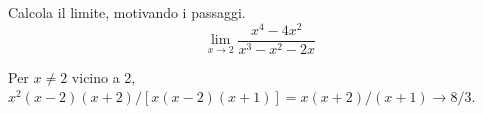 
\begin{esercizio}
Calcola il limite, motivando i passaggi.
\[
        \lim_{x\to 2}
        \frac{x^4-4x^2}{x^3-x^2-2x}
    \]
\end{esercizio}

\begin{soluzione}
Per $x\ne2$ vicino a 2, $x^2(x-2)(x+2)/[x(x-2)(x+1)]=x(x+2)/(x+1)\to8/3$.
\end{soluzione}
